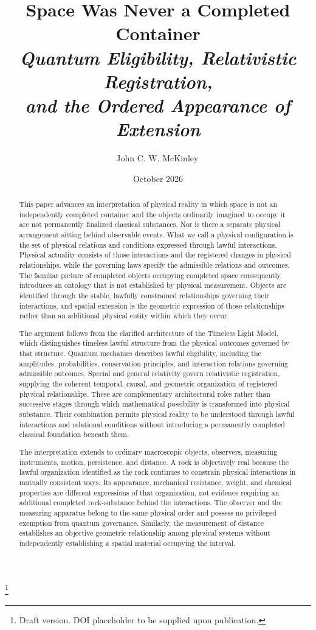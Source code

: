 \documentclass[12pt,onecolumn]{article}
\title{\textbf{Space Was Never a Completed Container}\\[0.4em]
\large\textit{Quantum Eligibility, Relativistic Registration,\\
and the Ordered Appearance of Extension}}
\author{John C. W. McKinley\,\orcidlink{0009-0005-7097-5035}}
\date{October 2026}
\newcommand\blfootnote[1]{%
  \begingroup
  \renewcommand\thefootnote{}\footnote{#1}%
  \addtocounter{footnote}{-1}%
  \endgroup
}
\begin{document}
\maketitle

\blfootnote{\scriptsize Draft version. DOI placeholder to be supplied upon publication.}

\begin{abstract}

This paper advances an interpretation of physical reality in which space is not an independently completed container and the objects ordinarily imagined to occupy it are not permanently finalized classical substances. Nor is there a separate physical arrangement sitting behind observable events. What we call a physical configuration is the set of physical relations and conditions expressed through lawful interactions. Physical actuality consists of those interactions and the registered changes in physical relationships, while the governing laws specify the admissible relations and outcomes. The familiar picture of completed objects occupying completed space consequently introduces an ontology that is not established by physical measurement. Objects are identified through the stable, lawfully constrained relationships governing their interactions, and spatial extension is the geometric expression of those relationships rather than an additional physical entity within which they occur.

The argument follows from the clarified architecture of the Timeless Light Model, which distinguishes timeless lawful structure from the physical outcomes governed by that structure. Quantum mechanics describes lawful eligibility, including the amplitudes, probabilities, conservation principles, and interaction relations governing admissible outcomes. Special and general relativity govern relativistic registration, supplying the coherent temporal, causal, and geometric organization of registered physical relationships. These are complementary architectural roles rather than successive stages through which mathematical possibility is transformed into physical substance. Their combination permits physical reality to be understood through lawful interactions and relational conditions without introducing a permanently completed classical foundation beneath them.

The interpretation extends to ordinary macroscopic objects, observers, measuring instruments, motion, persistence, and distance. A rock is objectively real because the lawful organization identified as the rock continues to constrain physical interactions in mutually consistent ways. Its appearance, mechanical resistance, weight, and chemical properties are different expressions of that organization, not evidence requiring an additional completed rock-substance behind the interactions. The observer and the measuring apparatus belong to the same physical order and possess no privileged exemption from quantum governance. Similarly, the measurement of distance establishes an objective geometric relationship among physical systems without independently establishing a spatial material occupying the interval.


\end{abstract}
\end{document}
